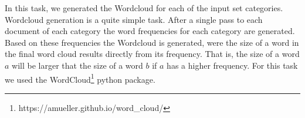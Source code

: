 In this task, we generated the Wordcloud for each of the input set categories. Wordcloud generation is a quite simple task. After a single pass to each document of each category the word frequencies for each category are generated. Based on these frequencies the Wordcloud is generated, were the size of a word in the final word cloud results directly from its frequency. That is, the size of a word $a$ will be larger that the size of a word $b$ if $a$ has a higher frequency. For this task we used the WordCloud\footnote{https://amueller.github.io/word\_cloud/} python package.